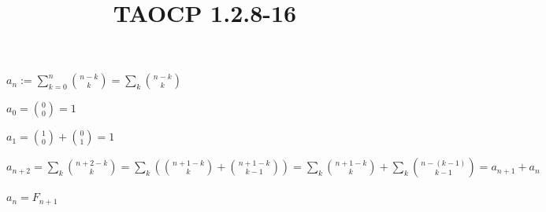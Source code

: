 \documentclass{article}
\title{TAOCP 1.2.8\mbox{-}16}
\begin{document}
\maketitle

\( a_{n} := \sum_{k=0}^{n} \binom{n-k}{k} = \sum_{k} \binom{n-k}{k} \)

\( a_{0} = \binom{0}{0} = 1 \)

\( a_{1} = \binom{1}{0} + \binom{0}{1} = 1 \)

\( a_{n+2} = \sum_{k}\binom{n+2-k}{k} = \sum_{k}(\binom{n+1-k}{k} + \binom{n+1-k}{k-1}) = \sum_{k}\binom{n+1-k}{k} + \sum_{k}\binom{n-(k-1)}{k-1} = a_{n+1} + a_{n} \)

\( a_{n} = F_{n+1} \)
\end{document}
